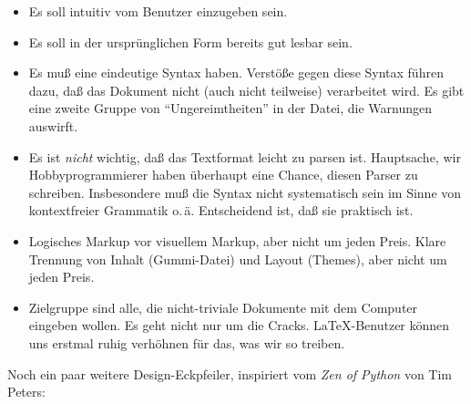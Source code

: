 \documentclass[12pt,openany]{book}
\begin{document}
\begin{itemize}
\item Es soll intuitiv vom Benutzer einzugeben sein.
\item Es soll in der ursprünglichen Form bereits gut lesbar sein.
\item Es muß eine eindeutige Syntax haben.  Verstöße gegen diese Syntax führen
  dazu, daß das Dokument nicht (auch nicht teilweise) verarbeitet wird.  Es
  gibt eine zweite Gruppe von "`Ungereimtheiten"' in der Datei, die Warnungen
  auswirft.
\item Es ist \emph{nicht} wichtig, daß das Textformat leicht zu parsen ist.
  Hauptsache, wir Hobbyprogrammierer haben überhaupt eine Chance, diesen Parser
  zu schreiben.  Insbesondere muß die Syntax nicht systematisch sein im Sinne
  von kontextfreier Grammatik o.\,ä.  Entscheidend ist, daß sie praktisch ist.
\item Logisches Markup vor visuellem Markup, aber nicht um jeden Preis.  Klare
  Trennung von Inhalt (Gummi-Datei) und Layout (Themes), aber nicht um jeden
  Preis.
\item Zielgruppe sind alle, die nicht-triviale Dokumente mit dem Computer
  eingeben wollen.  Es geht nicht nur um die Cracks.  \LaTeX-Benutzer können
  uns erstmal ruhig verhöhnen für das, was wir so treiben.
\end{itemize}

Noch ein paar weitere Design-Eckpfeiler, inspiriert vom \emph{Zen of Python}
von Tim Peters:
\end{document}
